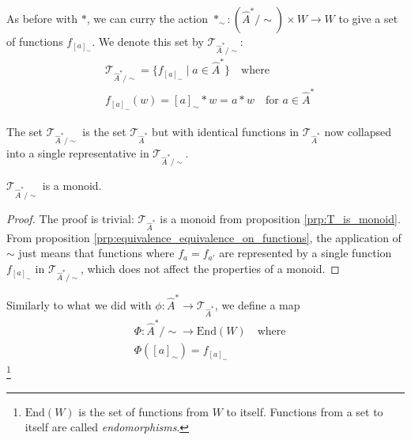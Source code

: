 
As before with $\ast$, we can curry the action $\ast_{\sim}: (\hat{A}^{\ast}/\sim) \times W \to W$ to give a set of functions $f_{[a]_{\sim}}$.
We denote this set by $\mathcal{T}_{\hat{A}^{\ast}/\sim}$:
\begin{equation}
\begin{aligned}
    & \mathcal{T}_{\hat{A}^{\ast}/\sim} = \{ f_{[a]_{\sim}} \mid a \in \hat{A}^{\ast} \} \quad \text{where} \\
    & f_{[a]_{\sim}}(w) = [a]_{\sim} \ast w = a \ast w \quad \text{for $a \in \hat{A}^{\ast}$}
\end{aligned}
\end{equation}

The set $\mathcal{T}_{\hat{A}^{\ast}/\sim}$ is the set $\mathcal{T}_{\hat{A}^{\ast}}$ but with identical functions in $\mathcal{T}_{\hat{A}^{\ast}}$ now collapsed into a single representative in $\mathcal{T}_{\hat{A}^{\ast}/\sim}$.

\begin{proposition}
    $\mathcal{T}_{\hat{A}^{\ast}/\sim}$ is a monoid.
\end{proposition}
\begin{proof}
    The proof is trivial: $\mathcal{T}_{\hat{A}^{\ast}}$ is a monoid from proposition \ref{prp:T_is_monoid}.
    From proposition \ref{prp:equivalence_equivalence_on_functions}, the application of $\sim$ just means that functions where $f_{a}=f_{a'}$ are represented by a single function $f_{[a]_{\sim}}$ in $\mathcal{T}_{\hat{A}^{\ast}/\sim}$, which does not affect the properties of a monoid.
\end{proof}

Similarly to what we did with $\phi: \hat{A}^{\ast} \to \mathcal{T}_{\hat{A}^{\ast}}$, we define a map
\begin{equation}
\begin{aligned}
    & \Phi : \hat{A}^{\ast}/\sim \to \text{End}(W) \quad \text{where} \\
    & \Phi([a]_{\sim}) = f_{[a]_{\sim}} 
\end{aligned}
\end{equation}
\footnote{$\text{End}(W)$ is the set of functions from $W$ to itself.
Functions from a set to itself are called \emph{endomorphisms}.}

